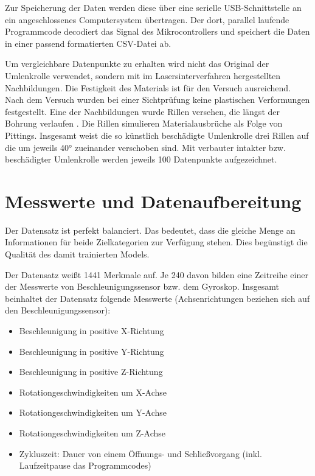 Zur Speicherung der Daten werden diese über eine serielle USB-Schnittstelle an ein angeschlossenes Computersystem übertragen. Der dort, parallel laufende Programmcode decodiert das Signal des Mikrocontrollers und speichert die Daten in einer passend formatierten CSV-Datei ab.

Um vergleichbare Datenpunkte zu erhalten wird nicht das Original der Umlenkrolle verwendet, sondern mit im Lasersinterverfahren hergestellten Nachbildungen. Die Festigkeit des Materials ist für den Versuch ausreichend. Nach dem Versuch wurden bei einer Sichtprüfung keine plastischen Verformungen festgestellt. Eine der Nachbildungen wurde Rillen versehen, die längst der Bohrung verlaufen . Die Rillen simulieren Materialausbrüche als Folge von Pittings. Insgesamt weist die so künstlich beschädigte Umlenkrolle drei Rillen auf die um jeweils 40°  zueinander verschoben sind. Mit verbauter intakter bzw. beschädigter Umlenkrolle werden jeweils 100 Datenpunkte aufgezeichnet.

\section{Messwerte und Datenaufbereitung}
\label{sec:messdaten}
Der Datensatz ist perfekt balanciert. Das bedeutet, dass die gleiche Menge an Informationen für beide Zielkategorien zur Verfügung stehen. Dies begünstigt die Qualität des damit trainierten Models.

Der Datensatz weißt \num{1441} Merkmale auf. Je \num{240} davon bilden eine Zeitreihe einer der Messwerte von Beschleunigungssensor bzw. dem Gyroskop. Insgesamt beinhaltet der Datensatz folgende Messwerte (Achsenrichtungen beziehen sich auf den Beschleunigungssensor):
\begin{itemize}
	\item Beschleunigung in positive X-Richtung
	\item Beschleunigung in positive Y-Richtung
	\item Beschleunigung in positive Z-Richtung
	\item Rotationgeschwindigkeiten um X-Achse
	\item Rotationgeschwindigkeiten um Y-Achse
	\item Rotationgeschwindigkeiten um Z-Achse
	\item Zykluszeit: Dauer von einem Öffnungs- und Schließvorgang (inkl. Laufzeitpause das Programmcodes)
\end{itemize}

